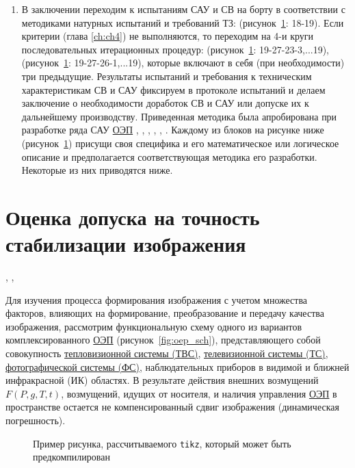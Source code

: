 \begin{enumerate}
	\item В заключении переходим к испытаниям САУ и СВ на борту в соответствии с методиками натурных испытаний и требований ТЗ: (рисунок~\ref{fig:tikz_example}: 18-19). Если критерии (глава \ref{ch:ch4}) не выполняются, то переходим  на 
	4-и круги последовательных итерационных процедур: (рисунок~\ref{fig:tikz_example}: 19-27-23-3,...19), (рисунок~\ref{fig:tikz_example}: 19-27-26-1,...19), которые включают в себя (при необходимости) три предыдущие. Результаты испытаний и требования к техническим характеристикам СВ и САУ фиксируем в протоколе испытаний и делаем заключение о необходимости доработок СВ и САУ или допуске их к дальнейшему производству.
	Приведенная методика была апробирована при разработке ряда САУ \hyperref[acroEOS]{ОЭП} \cite[]{Belyakov}, \cite[]{Karpov}, \cite[]{Baloev16}, \cite[]{Karpov17}, \cite[]{Gerasin19}, \cite[]{Molin21}. Каждому из блоков на рисунке ниже (рисунок~\ref{fig:tikz_example}) присущи своя специфика и его математическое или логическое описание и предполагается соответствующая методика его разработки. Некоторые из них приводятся ниже.

\end{enumerate}

\section{Оценка допуска на точность стабилизации изображения} \cite[]{Belyakov}, \cite[]{Sokolski22}, \cite[]{Molin21} \label{sec:ch2/sec2} 



Для изучения процесса формирования изображения с учетом множества факторов, влияющих на формирование, преобразование и передачу качества изображения, рассмотрим функциональную схему одного из вариантов комплексированного \hyperref[acroEOS]{ОЭП} (рисунок~\ref{fig:oep_sch}), представляющего собой совокупность \hyperref[acroTVS]{тепловизионной системы (ТВС)}, \hyperref[acroTS]{телевизионной системы (ТС)}, \hyperref[acroFS]{фотографической системы (ФС)}, наблюдательных приборов в видимой и ближней инфракрасной (ИК) областях. В результате действия внешних возмущений $F(P,g,T,t)$, возмущений, идущих от носителя, и наличия управления \hyperref[acroEOS]{ОЭП} в пространстве остается не компенсированный сдвиг изображения (динамическая погрешность).


\begin{figure}[ht]
	{\centering
		
		
	}
	\legend{}
	\caption[Пример \texttt{tikz} схемы]{Пример рисунка, рассчитываемого
		\texttt{tikz}, который может быть предкомпилирован}
	\label{fig:tikz_example}
\end{figure}


